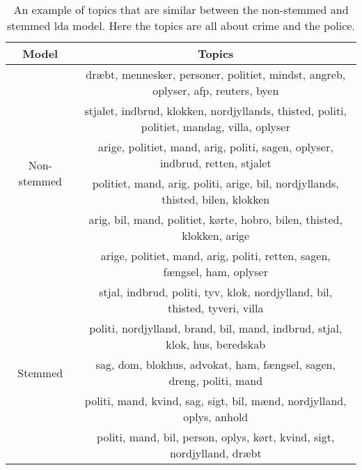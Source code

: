 \begin{table}
	\caption{An example of topics that are similar between the non-stemmed and stemmed \gls{lda} model.
		Here the topics are all about crime and the police.}
	\label{tab:topic_examples}
	\centering
	\begin{tabular}{c|c}
		Model & Topics \\
		\midrule
		\multirow{6}{*}{Non-stemmed} & dræbt, mennesker, personer, politiet, mindst, angreb, oplyser, afp, reuters, byen  \\
		 & stjalet, indbrud, klokken, nordjyllands, thisted, politi, politiet, mandag, villa, oplyser  \\
		 & arige, politiet, mand, arig, politi, sagen, oplyser, indbrud, retten, stjalet  \\
		 & politiet, mand, arig, politi, arige, bil, nordjyllands, thisted, bilen, klokken  \\
		 & arig, bil, mand, politiet, kørte, hobro, bilen, thisted, klokken, arige  \\
		 & arige, politiet, mand, arig, politi, retten, sagen, fængsel, ham, oplyser  \\
		\midrule
		\multirow{5}{*}{Stemmed} & stjal, indbrud, politi, tyv, klok, nordjylland, bil, thisted, tyveri, villa  \\
		 & politi, nordjylland, brand, bil, mand, indbrud, stjal, klok, hus, beredskab  \\
		 & sag, dom, blokhus, advokat, ham, fængsel, sagen, dreng, politi, mand  \\
		 & politi, mand, kvind, sag, sigt, bil, mænd, nordjylland, oplys, anhold  \\
		 & politi, mand, bil, person, oplys, kørt, kvind, sigt, nordjylland, dræbt  \\
	\end{tabular}
\end{table}
